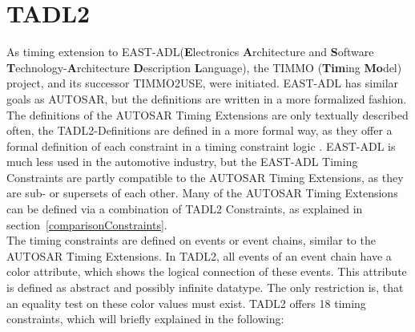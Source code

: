 \newpage

\section{TADL2}
	As timing extension to EAST-ADL(\textbf{E}lectronics \textbf{A}rchitecture and \textbf{S}oftware \textbf{T}echnology-\textbf{A}rchitecture \textbf{D}escription \textbf{L}anguage), the TIMMO (\textbf{Tim}ing \textbf{Mo}del) project, and its successor TIMMO2USE, were initiated. EAST-ADL has similar goals as AUTOSAR, but the definitions are written in a more formalized fashion. The definitions of the AUTOSAR Timing Extensions are only textually described often, the TADL2-Definitions are defined in a more formal way, as they offer a formal definition of each constraint in a timing constraint logic \cite{TIMMO2USE}. EAST-ADL is much less used in the automotive industry, but the EAST-ADL Timing Constraints are partly compatible to the AUTOSAR Timing Extensions, as they are sub- or supersets of each other. Many of the AUTOSAR Timing Extensions can be defined via a combination of TADL2 Constraints, as explained in section~\ref{comparisonConstraints}.\\
	The timing constraints are defined on events or event chains, similar to the AUTOSAR Timing Extensions. In TADL2, all events of an event chain have a color attribute, which shows the logical connection of these events. This attribute is defined as abstract and possibly infinite datatype. The only restriction is, that an equality test on these color values must exist. TADL2 offers 18 timing constraints, which will briefly explained in the following:
